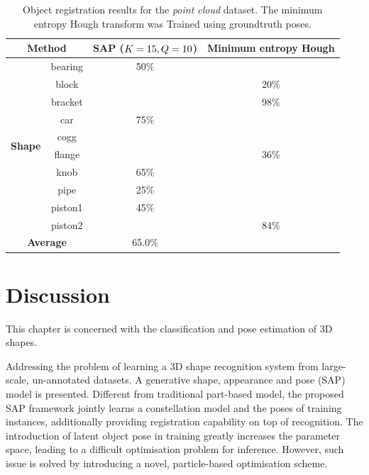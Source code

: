 \begin{table}[ht]
	\centering
	\begin{tabular}{|c|c|c|c|}
		\hline 	
		\multicolumn{2}{|c|}{\textbf{Method}} & SAP ($K = 15, Q = 10$) & Minimum entropy Hough \cite{Woodford2013} \\ \hline \hline 
		\multirow{10}{*}{\textbf{Shape}} & bearing & 50\% & \color{blue}{83\%} \\ \cline{2-4}  
		& block & \color{blue}{35\%} & 20\% \\ \cline{2-4} 
		& bracket & \color{blue}{100\%} & 98\% \\ \cline{2-4}
		& car & 75\% & \color{blue}{91\%} \\ \cline{2-4}
		& cogg & \color{blue}{100\%} & \color{blue}{100\%} \\ \cline{2-4}
		& flange & \color{blue}{60\%} & 36\% \\ \cline{2-4}
		& knob & 65\% & \color{blue}{91\%} \\ \cline{2-4}
		& pipe & 25\% & \color{blue}{89\%} \\ \cline{2-4}
		& piston1 & 45\% & \color{blue}{54\%} \\ \cline{2-4}
		& piston2 & \color{blue}{95\%} & 84\% \\ \hline 
		\multicolumn{2}{|c|}{\textbf{Average}} & 65.0\% & \color{blue}{74.6\%} \\ \hline 
	\end{tabular}
	\caption{Object registration results for the \emph{point cloud} dataset. The minimum entropy Hough transform \cite{Woodford2013} was Trained using groundtruth poses.}
	\label{tab/reg/regresult3d}
\end{table}

\section{Discussion}
\label{sec/reg/conclusions}

This chapter is concerned with the classification and pose estimation of 3D shapes. 

Addressing the problem of learning a 3D shape recognition system from large-scale, un-annotated datasets.   
A generative shape, appearance and pose (SAP) model is presented. Different from traditional part-based model, the proposed SAP framework jointly learns a constellation model and the poses of training instances, additionally providing registration capability on top of recognition. The introduction of latent object pose in training greatly increases the parameter space, leading to a difficult optimisation problem for inference. However, such issue is solved by introducing a novel, particle-based optimisation scheme.  

